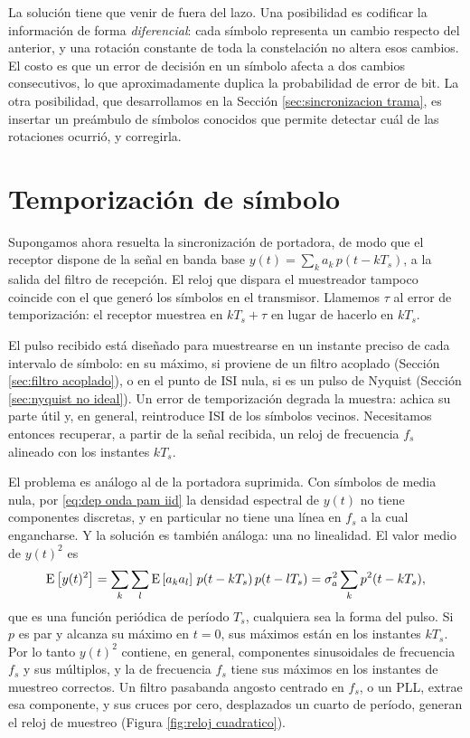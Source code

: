 La solución tiene que venir de fuera del lazo. Una posibilidad es codificar la información de forma \emph{diferencial}: cada símbolo representa un cambio respecto del anterior, y una rotación constante de toda la constelación no altera esos cambios. El costo es que un error de decisión en un símbolo afecta a dos cambios consecutivos, lo que aproximadamente duplica la probabilidad de error de bit. La otra posibilidad, que desarrollamos en la Sección \ref{sec:sincronizacion trama}, es insertar un preámbulo de símbolos conocidos que permite detectar cuál de las rotaciones ocurrió, y corregirla.

\section{Temporización de símbolo}\label{sec:temporizacion}

Supongamos ahora resuelta la sincronización de portadora, de modo que el receptor dispone de la señal en banda base $y(t)=\sum_k a_k\,p(t-kT_s)$, a la salida del filtro de recepción. El reloj que dispara el muestreador tampoco coincide con el que generó los símbolos en el transmisor. Llamemos $\tau$ al error de temporización: el receptor muestrea en $kT_s+\tau$ en lugar de hacerlo en $kT_s$.

El pulso recibido está diseñado para muestrearse en un instante preciso de cada intervalo de símbolo: en su máximo, si proviene de un filtro acoplado (Sección \ref{sec:filtro acoplado}), o en el punto de ISI nula, si es un pulso de Nyquist (Sección \ref{sec:nyquist no ideal}). Un error de temporización degrada la muestra: achica su parte útil y, en general, reintroduce ISI de los símbolos vecinos. Necesitamos entonces recuperar, a partir de la señal recibida, un reloj de frecuencia $f_s$ alineado con los instantes $kT_s$.

El problema es análogo al de la portadora suprimida. Con símbolos de media nula, por \eqref{eq:dep onda pam iid} la densidad espectral de $y(t)$ no tiene componentes discretas, y en particular no tiene una línea en $f_s$ a la cual engancharse. Y la solución es también análoga: una no linealidad. El valor medio de $y(t)^2$ es
\begin{equation*}
    \mathrm{E}\left[y(t)^2\right] = \sum_k\sum_l \mathrm{E}\left[a_ka_l\right]\,p(t-kT_s)\,p(t-lT_s) = \sigma_a^2\sum_k p^2(t-kT_s),
\end{equation*}
que es una función periódica de período $T_s$, cualquiera sea la forma del pulso. Si $p$ es par y alcanza su máximo en $t=0$, sus máximos están en los instantes $kT_s$. Por lo tanto $y(t)^2$ contiene, en general, componentes sinusoidales de frecuencia $f_s$ y sus múltiplos, y la de frecuencia $f_s$ tiene sus máximos en los instantes de muestreo correctos. Un filtro pasabanda angosto centrado en $f_s$, o un PLL, extrae esa componente, y sus cruces por cero, desplazados un cuarto de período, generan el reloj de muestreo (Figura \ref{fig:reloj cuadratico}).

